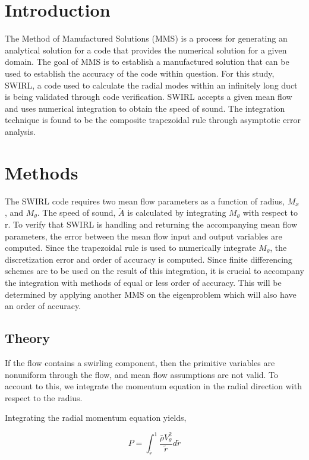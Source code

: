 

\section{Introduction}
The Method of Manufactured Solutions (MMS) is a process for generating an 
analytical solution for a code that provides the numerical solution for a 
given domain. The goal of MMS is to establish a manufactured solution that can 
be used to establish the accuracy of the code within question. For this study, 
SWIRL, a code used to calculate the radial modes within an infinitely long duct
is being validated through code verification. SWIRL accepts a given mean flow and 
uses numerical integration to obtain the speed of sound. The integration technique
is found to be the composite trapezoidal rule through asymptotic error analysis.


\section{Methods}
The SWIRL code requires two mean flow parameters as a function of radius, $M_x$
, and $M_{\theta}$. The speed of sound, $\widetilde{A}$ is calculated by 
integrating $M_{\theta}$ with respect to r. To verify that SWIRL is handling 
and returning the accompanying mean flow parameters, the error between the 
mean flow input and output variables are computed. Since the trapezoidal rule
is used to numerically integrate $M_{\theta}$, the discretization error and 
order of accuracy is computed. Since finite differencing schemes are to be used 
on the result of this integration, it is crucial to accompany the integration 
with methods of equal or less order of accuracy. This will be determined by 
applying another MMS on the eigenproblem which will also have an order of 
accuracy.

\subsection{Theory}

If the flow contains a swirling component,
then the primitive variables are nonuniform through the flow, and mean flow assumptions are not valid. To account to this,
we integrate the momentum equation in the radial direction with
respect to the radius. 

Integrating the radial momentum equation yields,

\[P = \int_{\tilde{r}}^{1} \frac{\bar{\rho} V_{\theta}^2}{\tilde{r}} d\tilde{r}\] 

